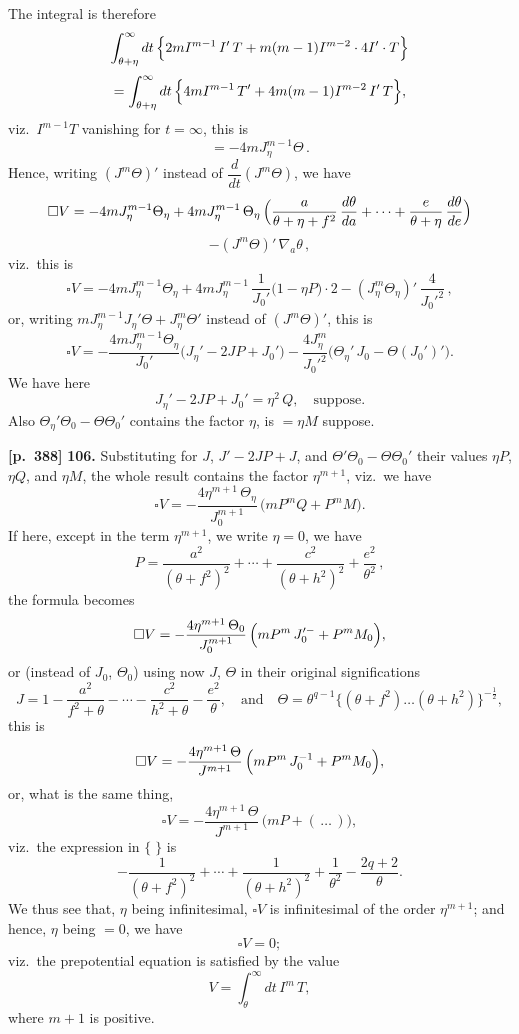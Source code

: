 \documentclass[11pt,a4paper]{article}
\begin{document}
The integral is therefore
\[
\int_{\theta + \eta}^{\infty} dt\,\Bigl\{ 2m I^{m-1}\,I'\,T + m(m-1) I^{m-2}\cdot 4 I' \cdot T \Bigr\}
\]
\[
= \int_{\theta + \eta}^{\infty} dt\,\Bigl\{ 4m I^{m-1}\,T' + 4 m(m-1) I^{m-2}\,I'\,T \Bigr\},
\]
viz.\ $I^{m-1}T$ vanishing for $t = \infty$, this is
\[
= -4 m J_{\eta}^{m-1}\Theta\,.
\]
Hence, writing $(J^{m}\Theta)'$ instead of $\dfrac{d}{dt}(J^{m}\Theta)$, we have
\[
\square V = -4 m J_{\eta}^{m-1}\Theta_{\eta}
+ 4 m J_{\eta}^{m-1}\,\Theta_{\eta}\,\Bigl( \frac{a}{\theta + \eta + f^{2}}\,\frac{d\theta}{da} + \cdots + \frac{e}{\theta + \eta}\,\frac{d\theta}{de} \Bigr)
\]
\[
- (J^{m}\Theta)'\,\nabla_{a}\theta\,,
\]
viz.\ this is
\[
\square V = -4 m J_{\eta}^{m-1}\Theta_{\eta}
+ 4 m J_{\eta}^{m-1}\,\frac{1}{J_{0}'}\bigl(1 - \eta P\bigr)\cdot 2
- (J_{\eta}^{m}\Theta_{\eta})'\,\frac{4}{J_{0}'^{2}}\,,
\]
or, writing $m J_{\eta}^{m-1}J_{\eta}'\Theta + J_{\eta}^{m}\Theta'$ instead of $(J^{m}\Theta)'$, this is
\[
\square V = -\frac{4 m J_{\eta}^{m-1}\Theta_{\eta}}{J_{0}'}\bigl(J_{\eta}' - 2 J P + J_{0}'\bigr) - \frac{4 J_{\eta}^{m}}{J_{0}'^{2}}\bigl(\Theta_{\eta}'\,J_{0} - \Theta(J_{0}')'\bigr).
\]
We have here
\[
J_{\eta}' - 2 J P + J_{0}' = \eta^{2}\,Q,\quad\text{suppose}.
\]
Also $\Theta_{\eta}'\Theta_{0} - \Theta\Theta_{0}'$ contains the factor $\eta$, is $= \eta M$ suppose.

\noindent\textbf{[p.~388]}\quad
\textbf{106.} Substituting for $J$, $J' - 2JP + J$, and $\Theta'\Theta_{0} - \Theta\Theta_{0}'$ their values $\eta P$, $\eta Q$, and $\eta M$, the whole result contains the factor $\eta^{m+1}$, viz.\ we have
\[
\square V = -\frac{4 \eta^{m+1}\,\Theta_{\eta}}{J_{0}^{m+1}}\,\bigl(m P^{m}Q + P^{m}M\bigr).
\]
If here, except in the term $\eta^{m+1}$, we write $\eta = 0$, we have
\[
P = \frac{a^{2}}{(\theta + f^{2})^{2}} + \cdots + \frac{c^{2}}{(\theta + h^{2})^{2}} + \frac{e^{2}}{\theta^{2}}\,,
\]
the formula becomes
\[
\square V = -\frac{4 \eta^{m+1}\,\Theta_{0}}{J_{0}^{m+1}}\,\Bigl( m P^{m}\,J_{0}'^{-} + P^{m}M_{0} \Bigr),
\]
or (instead of $J_{0}$, $\Theta_{0}$) using now $J$, $\Theta$ in their original significations
\[
J = 1 - \frac{a^{2}}{f^{2}+\theta} - \cdots - \frac{c^{2}}{h^{2}+\theta} - \frac{e^{2}}{\theta}, \quad\text{and}\quad
\Theta = \theta^{q-1}\bigl\{(\theta + f^{2})\ldots(\theta + h^{2})\bigr\}^{-\tfrac{1}{2}},
\]
this is
\[
\square V = -\frac{4 \eta^{m+1}\,\Theta}{J^{m+1}}\,\Bigl( m P^{m}\,J^{-1}_{0} + P^{m}M_{0} \Bigr),
\]
or, what is the same thing,
\[
\square V = -\frac{4 \eta^{m+1}\,\Theta}{J^{m+1}}\,\bigl( m P + (\,\ldots\,) \bigr),
\]
viz.\ the expression in $\{\;\}$ is
\[
-\frac{1}{(\theta + f^{2})^{2}} + \cdots + \frac{1}{(\theta + h^{2})^{2}} + \frac{1}{\theta^{2}} - \frac{2q+2}{\theta}.
\]
We thus see that, $\eta$ being infinitesimal, $\square V$ is infinitesimal of the order $\eta^{m+1}$; and hence, $\eta$ being $= 0$, we have
\[
\square V = 0;
\]
viz.\ the prepotential equation is satisfied by the value
\[
V = \int_{\theta}^{\infty} dt\, I^{m}\,T,
\]
where $m + 1$ is positive.
\end{document}
